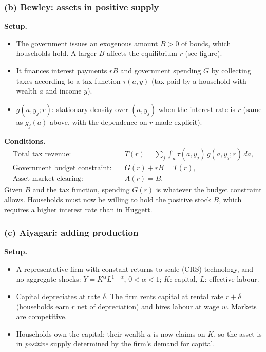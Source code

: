 \subsubsection*{(b) Bewley: assets in positive supply}
\textbf{Setup.}
\begin{itemize}
  \item The government issues an exogenous amount $B>0$ of bonds, which households hold. A larger $B$ affects the equilibrium $r$ (see figure).
  \item It finances interest payments $rB$ and government spending $G$ by collecting taxes according to a tax function $\tau(a,y)$ (tax paid by a household with wealth $a$ and income $y$).
  \item $g(a,y_j;r)$: stationary density over $(a,y_j)$ when the interest rate is $r$ (same as $g_j(a)$ above, with the dependence on $r$ made explicit).
\end{itemize}
\textbf{Conditions.}
\begin{align*}
  \text{Total tax revenue:}\quad & T(r)=\sum_j\int_a \tau(a,y_j)\,g(a,y_j;r)\,da,\\
  \text{Government budget constraint:}\quad & G(r)+rB=T(r),\\
  \text{Asset market clearing:}\quad & A(r)=B.
\end{align*}
Given $B$ and the tax function, spending $G(r)$ is whatever the budget constraint allows. Households must now be willing to hold the positive stock $B$, which requires a higher interest rate than in Huggett.

\subsubsection*{(c) Aiyagari: adding production}
\textbf{Setup.}
\begin{itemize}
  \item A representative firm with constant-returns-to-scale (CRS) technology, and no aggregate shocks:
  $Y=K^\alpha L^{1-\alpha}$, $0<\alpha<1$; $K$: capital, $L$: effective labour.
  \item Capital depreciates at rate $\delta$. The firm rents capital at rental rate $r+\delta$ (households earn $r$ net of depreciation) and hires labour at wage $w$. Markets are competitive.
  \item Households own the capital: their wealth $a$ is now claims on $K$, so the asset is in \emph{positive} supply determined by the firm's demand for capital.
\end{itemize}

